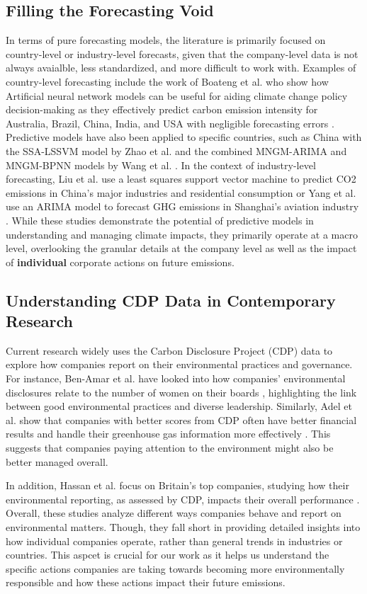 \subsection{Filling the Forecasting Void}
In terms of pure forecasting models, the literature is primarily focused on country-level or industry-level forecasts, given that the company-level data is not always avaialble, less standardized, and more difficult to work with. Examples of country-level forecasting include the work of Boateng et al. who show how Artificial neural network models can be useful for aiding climate change policy decision-making as they effectively predict carbon emission intensity for Australia, Brazil, China, India, and USA with negligible forecasting errors \cite{acheampong}. Predictive models have also been applied to specific countries, such as China with the SSA-LSSVM model by Zhao et al. and the combined MNGM-ARIMA and MNGM-BPNN models by Wang et al. \cite{wangfs, zhaofs}. In the context of industry-level forecasting, Liu et al. use a least squares support vector machine to predict CO2 emissions in China's major industries and residential consumption \cite{liu} or Yang et al. use an ARIMA model to forecast GHG emissions in Shanghai's aviation industry \cite{yang}. While these studies demonstrate the potential of predictive models in understanding and managing climate impacts, they primarily operate at a macro level, overlooking the granular details at the company level as well as the impact of \textbf{individual} corporate actions on future emissions.

\subsection{Understanding CDP Data in Contemporary Research}

Current research widely uses the Carbon Disclosure Project (CDP) data to explore how companies report on their environmental practices and governance. For instance, Ben-Amar et al. have looked into how companies’ environmental disclosures relate to the number of women on their boards \cite{ben-amar}, highlighting the link between good environmental practices and diverse leadership. Similarly, Adel et al. show that companies with better scores from CDP often have better financial results and handle their greenhouse gas information more effectively \cite{teob}. This suggests that companies paying attention to the environment might also be better managed overall.

In addition, Hassan et al. focus on Britain's top companies, studying how their environmental reporting, as assessed by CDP, impacts their overall performance \cite{Hassan2013Carbon}. Overall, these studies analyze different ways companies behave and report on environmental matters. Though, they fall short in providing detailed insights into how individual companies operate, rather than general trends in industries or countries. This aspcet is crucial for our work as it helps us understand the specific actions companies are taking towards becoming more environmentally responsible and how these actions impact their future emissions.


